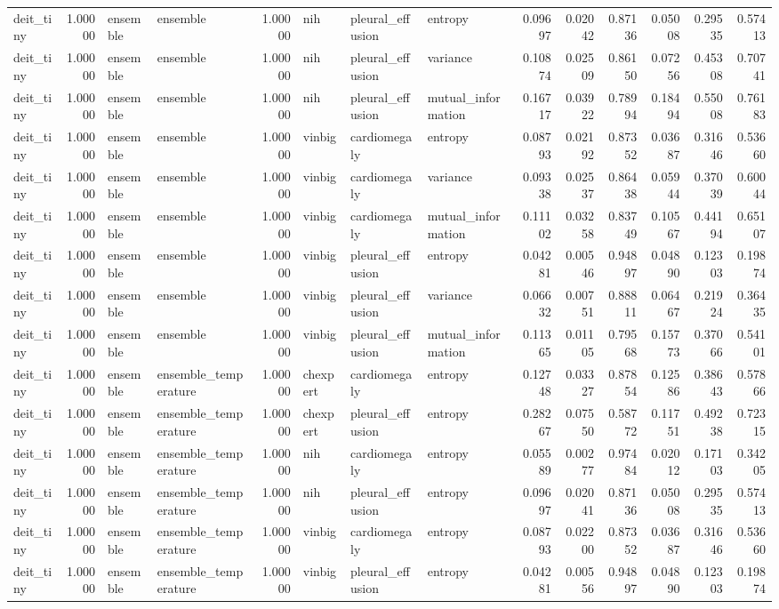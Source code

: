 \begin{tabular}{lrllrlllrrrrrr}
deit\_tiny & 1.00000 & ensemble & ensemble & 1.00000 & nih & pleural\_effusion & entropy & 0.09697 & 0.02042 & 0.87136 & 0.05008 & 0.29535 & 0.57413 \\
deit\_tiny & 1.00000 & ensemble & ensemble & 1.00000 & nih & pleural\_effusion & variance & 0.10874 & 0.02509 & 0.86150 & 0.07256 & 0.45308 & 0.70741 \\
deit\_tiny & 1.00000 & ensemble & ensemble & 1.00000 & nih & pleural\_effusion & mutual\_information & 0.16717 & 0.03922 & 0.78994 & 0.18494 & 0.55008 & 0.76183 \\
deit\_tiny & 1.00000 & ensemble & ensemble & 1.00000 & vinbig & cardiomegaly & entropy & 0.08793 & 0.02192 & 0.87352 & 0.03687 & 0.31646 & 0.53660 \\
deit\_tiny & 1.00000 & ensemble & ensemble & 1.00000 & vinbig & cardiomegaly & variance & 0.09338 & 0.02537 & 0.86438 & 0.05944 & 0.37039 & 0.60044 \\
deit\_tiny & 1.00000 & ensemble & ensemble & 1.00000 & vinbig & cardiomegaly & mutual\_information & 0.11102 & 0.03258 & 0.83749 & 0.10567 & 0.44194 & 0.65107 \\
deit\_tiny & 1.00000 & ensemble & ensemble & 1.00000 & vinbig & pleural\_effusion & entropy & 0.04281 & 0.00546 & 0.94897 & 0.04890 & 0.12303 & 0.19874 \\
deit\_tiny & 1.00000 & ensemble & ensemble & 1.00000 & vinbig & pleural\_effusion & variance & 0.06632 & 0.00751 & 0.88811 & 0.06467 & 0.21924 & 0.36435 \\
deit\_tiny & 1.00000 & ensemble & ensemble & 1.00000 & vinbig & pleural\_effusion & mutual\_information & 0.11365 & 0.01105 & 0.79568 & 0.15773 & 0.37066 & 0.54101 \\
deit\_tiny & 1.00000 & ensemble & ensemble\_temperature & 1.00000 & chexpert & cardiomegaly & entropy & 0.12748 & 0.03327 & 0.87854 & 0.12586 & 0.38643 & 0.57866 \\
deit\_tiny & 1.00000 & ensemble & ensemble\_temperature & 1.00000 & chexpert & pleural\_effusion & entropy & 0.28267 & 0.07550 & 0.58772 & 0.11751 & 0.49238 & 0.72315 \\
deit\_tiny & 1.00000 & ensemble & ensemble\_temperature & 1.00000 & nih & cardiomegaly & entropy & 0.05589 & 0.00277 & 0.97484 & 0.02012 & 0.17103 & 0.34205 \\
deit\_tiny & 1.00000 & ensemble & ensemble\_temperature & 1.00000 & nih & pleural\_effusion & entropy & 0.09697 & 0.02041 & 0.87136 & 0.05008 & 0.29535 & 0.57413 \\
deit\_tiny & 1.00000 & ensemble & ensemble\_temperature & 1.00000 & vinbig & cardiomegaly & entropy & 0.08793 & 0.02200 & 0.87352 & 0.03687 & 0.31646 & 0.53660 \\
deit\_tiny & 1.00000 & ensemble & ensemble\_temperature & 1.00000 & vinbig & pleural\_effusion & entropy & 0.04281 & 0.00556 & 0.94897 & 0.04890 & 0.12303 & 0.19874 \\
\bottomrule
\end{tabular}
